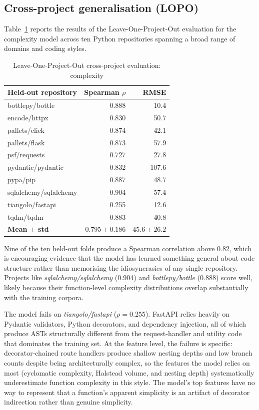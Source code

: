 \documentclass[12pt, oneside]{report}
\begin{document}
\subsection{Cross-project generalisation (LOPO)}

Table~\ref{tab:lopo} reports the results of the Leave-One-Project-Out evaluation for
the complexity model across ten Python repositories spanning a broad range of domains
and coding styles.

\begin{table}[H]
\centering
\caption{Leave-One-Project-Out cross-project evaluation: complexity}
\label{tab:lopo}
\begin{tabular}{@{}lrr@{}}
\toprule
\textbf{Held-out repository} & \textbf{Spearman $\rho$} & \textbf{RMSE} \\
\midrule
bottlepy/bottle       & 0.888 & 10.4 \\
encode/httpx          & 0.830 & 50.7 \\
pallets/click         & 0.874 & 42.1 \\
pallets/flask         & 0.873 & 57.9 \\
psf/requests          & 0.727 & 27.8 \\
pydantic/pydantic     & 0.832 & 107.6 \\
pypa/pip              & 0.887 & 48.7 \\
sqlalchemy/sqlalchemy & 0.904 & 57.4 \\
tiangolo/fastapi      & 0.255 & 12.6 \\
tqdm/tqdm             & 0.883 & 40.8 \\
\midrule
\textbf{Mean $\pm$ std} & $\mathbf{0.795 \pm 0.186}$ & $45.6 \pm 26.2$ \\
\bottomrule
\end{tabular}
\end{table}

Nine of the ten held-out folds produce a Spearman correlation above 0.82, which is
encouraging evidence that the model has learned something general about code structure
rather than memorising the idiosyncrasies of any single repository. Projects like
\textit{sqlalchemy/sqlalchemy} (0.904) and \textit{bottlepy/bottle} (0.888) score
well, likely because their function-level complexity distributions overlap
substantially with the training corpora.

The model fails on \textit{tiangolo/fastapi} ($\rho = 0.255$). FastAPI relies heavily
on Pydantic validators, Python decorators, and dependency injection, all of which produce
ASTs structurally different from the request-handler and utility code that dominates the
training set. At the feature level, the failure is specific: decorator-chained route
handlers produce shallow nesting depths and low branch counts despite being architecturally
complex, so the features the model relies on most (cyclomatic complexity, Halstead volume, and nesting depth) systematically underestimate function complexity in this style. The model's top features have no way to represent that a function's apparent
simplicity is an artifact of decorator indirection rather than genuine simplicity.
\end{document}
